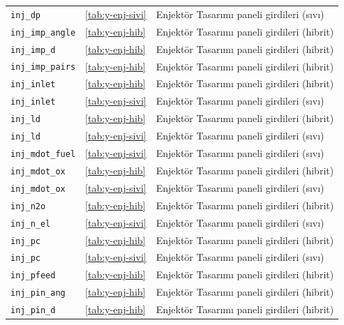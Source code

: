 \documentclass[11pt,a4paper]{article}
\begin{document}
{\begin{longtable}{@{}>{\raggedright\arraybackslash}p{5.2cm}p{1.4cm}>{\raggedright\arraybackslash}p{7.4cm}@{}}
\texttt{inj\_\allowbreak{}dp} & \ref{tab:y-enj-sivi} & Enjektör Tasarımı paneli girdileri (sıvı) \\
\texttt{inj\_\allowbreak{}imp\_\allowbreak{}angle} & \ref{tab:y-enj-hib} & Enjektör Tasarımı paneli girdileri (hibrit) \\
\texttt{inj\_\allowbreak{}imp\_\allowbreak{}d} & \ref{tab:y-enj-hib} & Enjektör Tasarımı paneli girdileri (hibrit) \\
\texttt{inj\_\allowbreak{}imp\_\allowbreak{}pairs} & \ref{tab:y-enj-hib} & Enjektör Tasarımı paneli girdileri (hibrit) \\
\texttt{inj\_\allowbreak{}inlet} & \ref{tab:y-enj-hib} & Enjektör Tasarımı paneli girdileri (hibrit) \\
\texttt{inj\_\allowbreak{}inlet} & \ref{tab:y-enj-sivi} & Enjektör Tasarımı paneli girdileri (sıvı) \\
\texttt{inj\_\allowbreak{}ld} & \ref{tab:y-enj-hib} & Enjektör Tasarımı paneli girdileri (hibrit) \\
\texttt{inj\_\allowbreak{}ld} & \ref{tab:y-enj-sivi} & Enjektör Tasarımı paneli girdileri (sıvı) \\
\texttt{inj\_\allowbreak{}mdot\_\allowbreak{}fuel} & \ref{tab:y-enj-sivi} & Enjektör Tasarımı paneli girdileri (sıvı) \\
\texttt{inj\_\allowbreak{}mdot\_\allowbreak{}ox} & \ref{tab:y-enj-hib} & Enjektör Tasarımı paneli girdileri (hibrit) \\
\texttt{inj\_\allowbreak{}mdot\_\allowbreak{}ox} & \ref{tab:y-enj-sivi} & Enjektör Tasarımı paneli girdileri (sıvı) \\
\texttt{inj\_\allowbreak{}n2o} & \ref{tab:y-enj-hib} & Enjektör Tasarımı paneli girdileri (hibrit) \\
\texttt{inj\_\allowbreak{}n\_\allowbreak{}el} & \ref{tab:y-enj-sivi} & Enjektör Tasarımı paneli girdileri (sıvı) \\
\texttt{inj\_\allowbreak{}pc} & \ref{tab:y-enj-hib} & Enjektör Tasarımı paneli girdileri (hibrit) \\
\texttt{inj\_\allowbreak{}pc} & \ref{tab:y-enj-sivi} & Enjektör Tasarımı paneli girdileri (sıvı) \\
\texttt{inj\_\allowbreak{}pfeed} & \ref{tab:y-enj-hib} & Enjektör Tasarımı paneli girdileri (hibrit) \\
\texttt{inj\_\allowbreak{}pin\_\allowbreak{}ang} & \ref{tab:y-enj-hib} & Enjektör Tasarımı paneli girdileri (hibrit) \\
\texttt{inj\_\allowbreak{}pin\_\allowbreak{}d} & \ref{tab:y-enj-hib} & Enjektör Tasarımı paneli girdileri (hibrit) \\

\end{longtable}}
\end{document}
